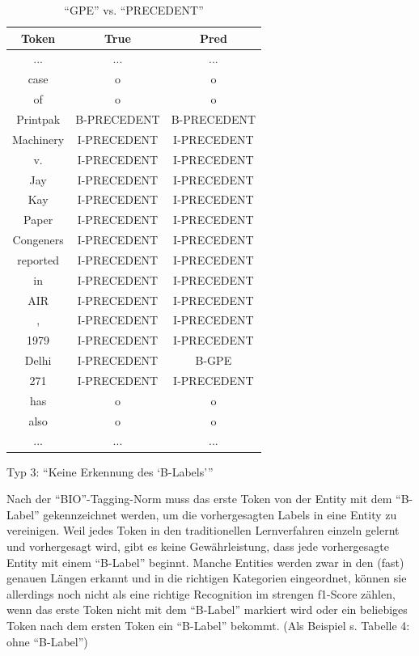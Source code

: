 \documentclass[paper=A4, ngerman, fontsize=12pt]{article}
\begin{document}
		\begin{table}
	\begin{center}
		\begin{tabular}{@{}| c | c c | @{}}
			\toprule
			Token & True& Pred   \\ \midrule
			\hline
			... & ... & ... \\ \midrule
			case & o & o \\ \midrule
			of & o & o \\ \midrule
			Printpak & B-PRECEDENT & B-PRECEDENT \\   \midrule
			Machinery & I-PRECEDENT & I-PRECEDENT \\   \midrule
			v. & I-PRECEDENT & I-PRECEDENT  \\  \midrule
			Jay &  I-PRECEDENT & I-PRECEDENT \\ \midrule
			Kay &  I-PRECEDENT& I-PRECEDENT \\   \midrule
			Paper & I-PRECEDENT & I-PRECEDENT \\  \midrule
			Congeners & I-PRECEDENT & I-PRECEDENT \\  \midrule
			reported & I-PRECEDENT & I-PRECEDENT \\  \midrule
			in & I-PRECEDENT & I-PRECEDENT \\  \midrule
			AIR & I-PRECEDENT & I-PRECEDENT \\  \midrule
			, & I-PRECEDENT & I-PRECEDENT \\  \midrule
			1979 & I-PRECEDENT & I-PRECEDENT \\  \midrule
			Delhi & I-PRECEDENT & B-GPE \\  \midrule
			271 & I-PRECEDENT & I-PRECEDENT \\  \midrule
			has & o & o \\  \midrule
			also & o & o  \\  \midrule
			... & ... & ... \\  \bottomrule
		\end{tabular}
		\caption{ \enquote{GPE} vs. \enquote{PRECEDENT} }
	\end{center}
\end{table}	
	
	\medskip
	\indent
	Typ 3: \enquote{Keine Erkennung des \enquote{B-Labels}}
	
	\indent
	Nach der \enquote{BIO}-Tagging-Norm muss das erste Token von der Entity mit dem \enquote{B-Label} gekennzeichnet werden, um die vorhergesagten Labels in eine Entity zu vereinigen. Weil jedes Token in den traditionellen Lernverfahren einzeln gelernt und vorhergesagt wird, gibt es keine Gewährleistung, dass jede vorhergesagte Entity mit einem \enquote{B-Label} beginnt. Manche Entities werden zwar in den (fast) genauen Längen erkannt und in die richtigen Kategorien eingeordnet, können sie allerdings noch nicht als eine richtige Recognition im strengen f1-Score zählen, wenn das erste Token nicht mit dem \enquote{B-Label} markiert wird oder ein beliebiges Token nach dem ersten Token ein \enquote{B-Label} bekommt. (Als Beispiel s. Tabelle 4: ohne \enquote{B-Label})
	
\end{document}
